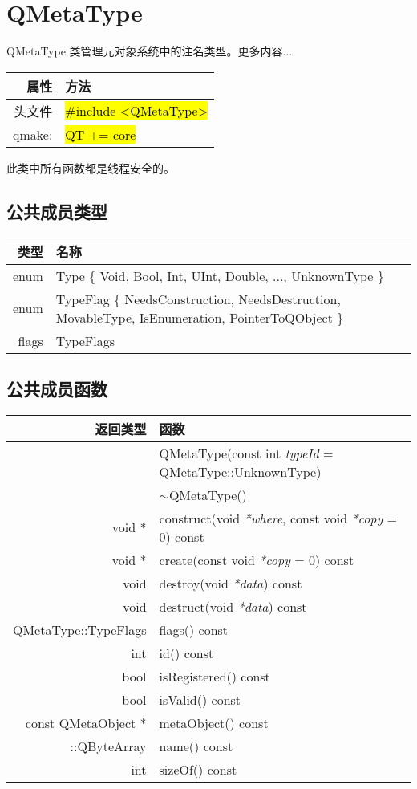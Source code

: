 \chapter{QMetaType}

QMetaType 类管理元对象系统中的注名类型。更多内容...

\begin{tabular}{|r|l|}
	\hline
	属性 & 方法 \\
	\hline
    头文件  &	\hl{\#include <QMetaType>} \\
    \hline
    qmake: & \hl{QT += core}    \\
	\hline
\end{tabular}

\begin{notice}
此类中所有函数都是线程安全的。
\end{notice}

\section{公共成员类型}

\begin{tabular}{|r|m{25em}|}   
\hline
类型 	& 名称 \\
\hline
enum &	Type \{ Void, Bool, Int, UInt, Double, ..., UnknownType \} \\
\hline
enum &	TypeFlag \{ NeedsConstruction, NeedsDestruction, MovableType, IsEnumeration, PointerToQObject \}\\
\hline
flags &	TypeFlags\\
\hline
\end{tabular}

\section{公共成员函数}

\begin{longtable}[l]{|r|m{28em}|}   
\hline
返回类型 	& 函数 \\
\hline
& QMetaType(const int \emph{typeId} = QMetaType::UnknownType) \\ 
\hline
& $\sim$QMetaType() \\
\hline
void *	&construct(void \emph{*where}, const void \emph{*copy} = 0) const \\
\hline
void *	&create(const void \emph{*copy} = 0) const \\
\hline
void	&destroy(void \emph{*data}) const \\
\hline
void	&destruct(void \emph{*data}) const \\
\hline
QMetaType::TypeFlags &	flags() const \\
\hline
int	& id() const \\ 
\hline
bool	&isRegistered() const \\
\hline
bool	&isValid() const \\
\hline
const QMetaObject *	& metaObject() const \\
\hline
::QByteArray &	name() const \\
\hline
int	& sizeOf() const \\
\hline
\end{longtable}

